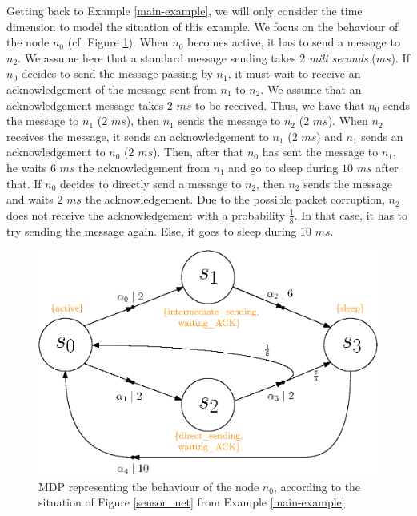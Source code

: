 \begin{example} \label{spg-example}
Getting back to Example \ref{main-example}, we will only consider the time dimension to model the situation of this example.
We focus on the behaviour of the node $n_0$  (cf. Figure \ref{sensor_net_mdp}).
When $n_0$ becomes active, it has to send a message to $n_2$. We assume here that a standard message sending takes $2$ \textit{mili seconds} ($ms$). If $n_0$ decides to send the message passing by $n_1$, it must wait to receive an acknowledgement of the message sent from $n_1$ to $n_2$. We assume that an acknowledgement message takes $2$ $ms$ to be received.
Thus, we have that $n_0$ sends the message to $n_1$ ($2$ $ms$), then $n_1$ sends the message to $n_2$ ($2$ $ms$). When $n_2$ receives the message, it sends an acknowledgement to $n_1$ ($2$ $ms$) and $n_1$ sends an acknowledgement to $n_0$ ($2$ $ms$).
Then, after that $n_0$ has sent the message to $n_1$, he waits $6$ $ms$ the acknowledgement from $n_1$ and go to sleep during $10$ $ms$ after that. If $n_0$ decides to directly send a message to $n_2$, then $n_2$ sends the message and waits $2$ $ms$ the acknowledgement.
Due to the possible packet corruption, $n_2$ does not receive the acknowledgement with a probability $\frac{1}{8}$. In that case, it has to try sending the message again.
Else, it goes to sleep during $10$ $ms$.
\begin{figure}[h]
  \centering
  \includegraphics[width=0.6\linewidth]{resources/example3.eps}
  \captionsetup{justification=centering}
  \caption{MDP representing the behaviour of the node $n_0$, according to the situation of Figure \ref{sensor_net} from Example \ref{main-example}}\label{sensor_net_mdp}
\end{figure}


\end{example}
